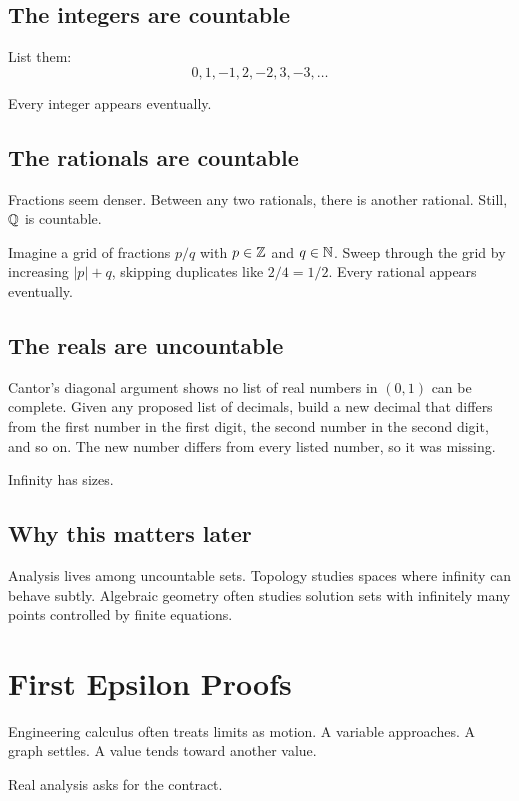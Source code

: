 \documentclass[11pt]{article}
\begin{document}
\subsection{The integers are countable}

List them:
\[
0,1,-1,2,-2,3,-3,\ldots
\]

Every integer appears eventually.

\subsection{The rationals are countable}

Fractions seem denser. Between any two rationals, there is another rational. Still, $\mathbb{Q}$ is countable.

Imagine a grid of fractions $p/q$ with $p\in\mathbb{Z}$ and $q\in\mathbb{N}$. Sweep through the grid by increasing $|p|+q$, skipping duplicates like $2/4=1/2$. Every rational appears eventually.

\subsection{The reals are uncountable}

Cantor's diagonal argument shows no list of real numbers in $(0,1)$ can be complete. Given any proposed list of decimals, build a new decimal that differs from the first number in the first digit, the second number in the second digit, and so on. The new number differs from every listed number, so it was missing.

Infinity has sizes.

\subsection{Why this matters later}

Analysis lives among uncountable sets. Topology studies spaces where infinity can behave subtly. Algebraic geometry often studies solution sets with infinitely many points controlled by finite equations.

\newpage
\section{First Epsilon Proofs}

Engineering calculus often treats limits as motion. A variable approaches. A graph settles. A value tends toward another value.

Real analysis asks for the contract.
\end{document}
